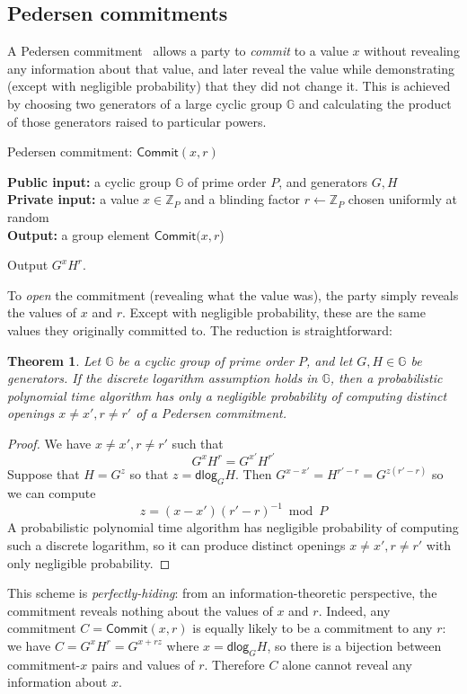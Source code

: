\documentclass[12pt,a4paper]{article}
\newcommand{\commit}{\mathsf{Commit}}
\newcommand{\dlog}{\mathsf{dlog}}
\newtheorem{theorem}{Theorem}
\theoremstyle{definition}
\begin{document}
\subsection{Pedersen commitments}\label{sec-pedersen}
A Pedersen commitment~\cite{pedersen1991non} allows a party to \textit{commit} to a value $x$ without revealing any information about that value, and later reveal the value while demonstrating (except with negligible probability) that they did not change it. This is achieved by choosing two generators of a large cyclic group $\mathbb{G}$ and calculating the product of those generators raised to particular powers.

\begin{algorithm}\caption{Pedersen commitment: $\commit(x, r)$}\label{prot:Pedersen}
    \textbf{Public input:} a cyclic group $\mathbb{G}$ of prime order $P$, and generators $G, H$\\
    \textbf{Private input:} a value $x\in\mathbb{Z}_P$ and a blinding factor $r\gets\mathbb{Z}_P$ chosen uniformly at random\\
    \textbf{Output:} a group element $\commit(x, r$)
    \begin{algorithmic}[1]
        \State Output $G^x H^{r}$.
    \end{algorithmic}
\end{algorithm}
To \textit{open} the commitment (revealing what the value was), the party simply reveals the values of $x$ and $r$. Except with negligible probability, these are the same values they originally committed to. The reduction is straightforward:
\begin{theorem}
    Let $\mathbb{G}$ be a cyclic group of prime order $P$, and let $G, H \in \mathbb{G}$ be generators. If the discrete logarithm assumption holds in $\mathbb{G}$, then a probabilistic polynomial time algorithm has only a negligible probability of computing distinct openings $x\neq x', r\neq r'$ of a Pedersen commitment.
\end{theorem}
\begin{proof}
    We have $x\neq x', r\neq r'$ such that
    $$G^x H^r = G^{x'} H^{r'}$$
    Suppose that $H = G^z$ so that $z = \dlog_G H$. Then $G^{x-x'} = H^{r' - r} = G^{z(r' - r)}$ so we can compute
        $$z = (x - x')(r' - r)^{-1} \bmod P$$
    A probabilistic polynomial time algorithm has negligible probability of computing such a discrete logarithm, so it can produce distinct openings $x\neq x', r\neq r'$ with only negligible probability.
\end{proof}
This scheme is \textit{perfectly-hiding}: from an information-theoretic perspective, the commitment reveals nothing about the values of $x$ and $r$. Indeed, any commitment $C = \commit(x, r)$ is equally likely to be a commitment to any $r$: we have $C = G^xH^r = G^{x + rz}$ where $x = \dlog_G H$, so there is a bijection between commitment-$x$ pairs and values of $r$. Therefore $C$ alone cannot reveal any information about $x$.
\end{document}
